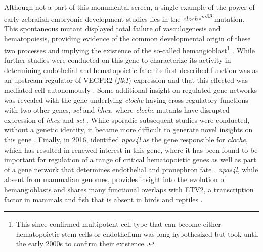Although not a part of this monumental screen, a single example of the power of early zebrafish embryonic development studies lies in the \textit{cloche\textsuperscript{m39}} mutation. This spontaneous mutant displayed total failure of vasculogenesis and hematopoiesis, providing evidence of the common developmental origin of these two processes and implying the existence of the so\hyp{}called hemangioblast\footnote{This since\hyp{}confirmed multipotent cell type that can become either hematopoietic stem cells or endothelium was long hypothesized \citep{Murray1932, Sabin1920} but took until the early 2000s to confirm their existence \citep{Xiong2008}.} \citep{Stainier1995}. While further studies were conducted on this gene to characterize its activity in determining endothelial and hematopoietic fate; its first described function was as an upstream regulator of VEGFR2 (\textit{flk1}) expression and that this effected was mediated cell\hyp{}autonomously \citep{Liao1997, Parker1999}. Some additional insight on regulated gene networks was revealed with the gene underlying \textit{cloche} having cross\hyp{}regulatory functions with two other genes, \textit{scl} and \textit{hhex}, where \textit{cloche} mutants have disrupted expression of \textit{hhex} and \textit{scl} \citep{Liao2000}. While sporadic subsequent studies were conducted, without a genetic identity, it became more difficult to generate novel insights on this gene \citep{Qian2005}. Finally, in 2016, \citeauthor{Reischauer2016} identified \textit{npas4l} as the gene responsible for \textit{cloche}, which has resulted in renewed interest in this gene, where it has been found to be important for regulation of a range of critical hematopoietic genes \citep{Marass2019} as well as part of a gene network that determines endothelial and pronephron fate \citep{Mattonet2022}. \textit{npas4l}, while absent from mammalian genomes, provides insight into the evolution of hemangioblasts and shares many functional overlaps with ETV2, a transcription factor in mammals and fish that is absent in birds and reptiles \citep{Weng2020, Vogeli2006}.

